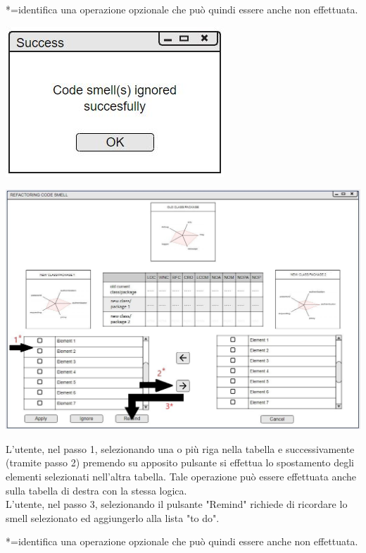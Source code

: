 \documentclass[11pt]{article}
\begin{document}
			*=identifica una operazione opzionale che può quindi essere anche non effettuata.
			\vspace{0.5cm}
			
			\centering	
			\includegraphics[scale=0.9]{pop_up_ignore.jpg}\\
			
			\includegraphics[width=\columnwidth]{mock-up_refactoring2_3.jpg}
			
			\flushleft
			L'utente, nel passo 1, selezionando una o più riga nella tabella e successivamente (tramite passo 2) premendo su apposito pulsante si effettua lo spostamento degli elementi selezionati nell'altra tabella. Tale operazione può essere effettuata anche sulla tabella di destra con la stessa logica.
			\\L'utente, nel passo 3, selezionando il pulsante "Remind"  richiede di ricordare lo smell selezionato ed aggiungerlo alla lista "to do".\vspace{0.2cm}
			
			*=identifica una operazione opzionale che può quindi essere anche non effettuata.
			\vspace{0.5cm}
			
\end{document}
